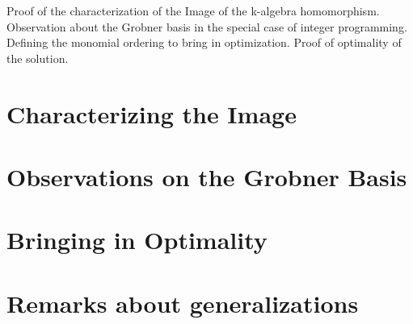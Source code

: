 
\noindent

Proof of the characterization of the Image of the k-algebra homomorphism. Observation about the Grobner basis in the special case of integer programming. Defining the monomial ordering to bring in optimization. Proof of optimality of the solution.

\section{Characterizing the Image}

\section{Observations on the Grobner Basis}

\section{Bringing in Optimality}

\section{Remarks about generalizations}
